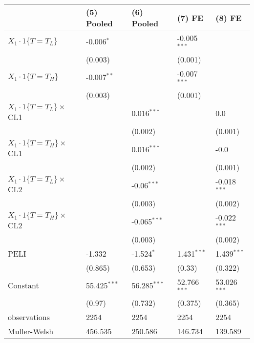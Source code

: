 \begin{tabular}{lllll}
\hline
 & (5) Pooled & (6) Pooled & (7) FE & (8) FE \\
\hline
$X_1\cdot1\{T=T_L\}$ & -0.006$^{*}$ &  & -0.005$^{***}$ &  \\
 & (0.003) &  & (0.001) &  \\
$X_1\cdot1\{T=T_H\}$ & -0.007$^{**}$ &  & -0.007$^{***}$ &  \\
 & (0.003) &  & (0.001) &  \\
$X_1\cdot1\{T=T_L\}\times$CL1 &  & 0.016$^{***}$ &  & 0.0 \\
 &  & (0.002) &  & (0.001) \\
$X_1\cdot1\{T=T_H\}\times$CL1 &  & 0.016$^{***}$ &  & -0.0 \\
 &  & (0.002) &  & (0.001) \\
$X_1\cdot1\{T=T_L\}\times$CL2 &  & -0.06$^{***}$ &  & -0.018$^{***}$ \\
 &  & (0.003) &  & (0.002) \\
$X_1\cdot1\{T=T_H\}\times$CL2 &  & -0.065$^{***}$ &  & -0.022$^{***}$ \\
 &  & (0.003) &  & (0.002) \\
PELI & -1.332 & -1.524$^{*}$ & 1.431$^{***}$ & 1.439$^{***}$ \\
 & (0.865) & (0.653) & (0.33) & (0.322) \\
Constant & 55.425$^{***}$ & 56.285$^{***}$ & 52.766$^{***}$ & 53.026$^{***}$ \\
 & (0.97) & (0.732) & (0.375) & (0.365) \\\hline

observations & 2254 & 2254 & 2254 & 2254 \\
Muller-Welsh & 456.535 & 250.586 & 146.734 & 139.589 \\
\hline
\end{tabular}
